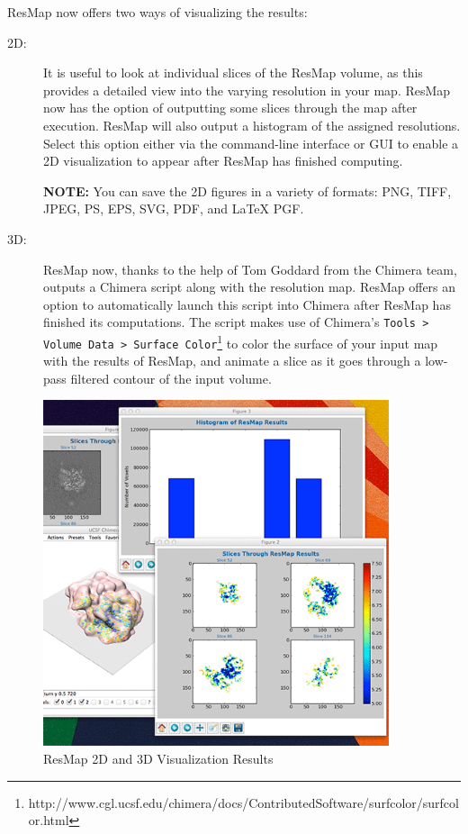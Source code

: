 \documentclass[10pt]{article}
\begin{document}
ResMap now offers two ways of visualizing the results:
\begin{description}
	\item[2D:] It is useful to look at individual slices of the ResMap volume, as this provides a detailed view into the varying resolution in your map. ResMap now has the option of outputting some slices through the map after execution. ResMap will also output a histogram of the assigned resolutions. Select this option either via the command-line interface or GUI to enable a 2D visualization to appear after ResMap has finished computing.

	\textcolor{RedOrange}{\textbf{NOTE:}} You can save the 2D figures in a variety of formats: PNG, TIFF, JPEG, PS, EPS, SVG, PDF, and \LaTeX{} PGF.

	\item[3D:] ResMap now, thanks to the help of Tom Goddard from the Chimera team, outputs a Chimera script along with the resolution map. ResMap offers an option to automatically launch this script into Chimera after ResMap has finished its computations. The script makes use of Chimera's \texttt{Tools > Volume Data > Surface Color}\footnote{http://www.cgl.ucsf.edu/chimera/docs/ContributedSoftware/surfcolor/surfcolor.html} to color the surface of your input map with the results of ResMap, and animate a slice as it goes through a low-pass filtered contour of the input volume. 
\end{description}

\begin{figure}[!h]
\centering
\includegraphics[width=4in]{img/viz.png}
\caption{ResMap 2D and 3D Visualization Results}
\end{figure}
\end{document}
